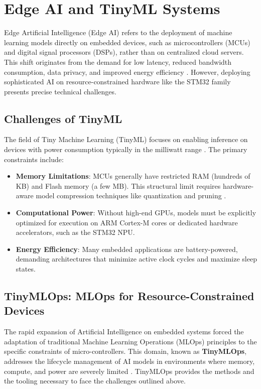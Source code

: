 \section{Edge AI and TinyML Systems}
\label{sec:edge-ai-stm32}

Edge Artificial Intelligence (Edge AI) refers to the deployment of machine learning models directly on embedded devices, such as microcontrollers (MCUs) and digital signal processors (DSPs), rather than on centralized cloud servers. This shift originates from the demand for low latency, reduced bandwidth consumption, data privacy, and improved energy efficiency \cite{warden2019tinyml}. However, deploying sophisticated AI on resource-constrained hardware like the STM32 family presents precise technical challenges.

\subsection{Challenges of TinyML}
The field of Tiny Machine Learning (TinyML) focuses on enabling inference on devices with power consumption typically in the milliwatt range \cite{warden2019tinyml}. The primary constraints include:

\begin{itemize}
    \item \textbf{Memory Limitations}: MCUs generally have restricted RAM (hundreds of KB) and Flash memory (a few MB). This structural limit requires hardware-aware model compression techniques like quantization and pruning \cite{st_cubeai_docs}.
    \item \textbf{Computational Power}: Without high-end GPUs, models must be explicitly optimized for execution on ARM Cortex-M cores or dedicated hardware accelerators, such as the STM32 NPU.
    \item \textbf{Energy Efficiency}: Many embedded applications are battery-powered, demanding architectures that minimize active clock cycles and maximize sleep states.
\end{itemize}

\subsection{TinyMLOps: MLOps for Resource-Constrained Devices}

The rapid expansion of Artificial Intelligence on embedded systems forced the adaptation of traditional Machine Learning Operations (MLOps) principles to the specific constraints of micro-controllers. This domain, known as \textbf{TinyMLOps}, addresses the lifecycle management of AI models in environments where memory, compute, and power are severely limited \cite{warden2019tinyml}. TinyMLOps provides the methods and the tooling necessary to face the challenges outlined above.

